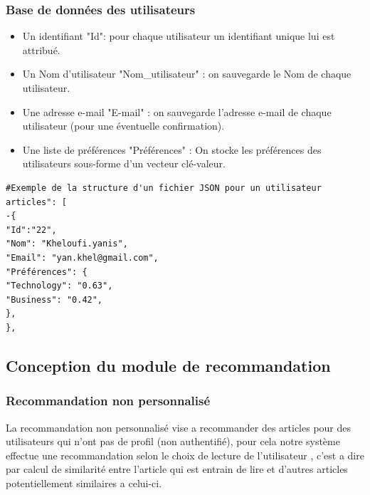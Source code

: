 \subsubsection{Base de données des utilisateurs}

\begin{itemize}
	
	\item Un identifiant "Id": pour chaque utilisateur un identifiant unique lui est attribué.\\
	
	\item Un Nom d'utilisateur "Nom\_utilisateur" : on sauvegarde le Nom de chaque utilisateur.\\
	
	\item Une adresse e-mail "E-mail" : on sauvegarde l'adresse e-mail de chaque utilisateur (pour une éventuelle confirmation).\\
	
	\item Une liste de préférences "Préférences" : On stocke les préférences des utilisateurs sous-forme d'un vecteur clé-valeur.\\
	
\end{itemize}

\begin{lstlisting}[style=code]
#Exemple de la structure d'un fichier JSON pour un utilisateur
articles": [
-{
"Id":"22",
"Nom": "Kheloufi.yanis",
"Email": "yan.khel@gmail.com",
"Préférences": {
"Technology": "0.63",
"Business": "0.42",
},
},
\end{lstlisting}

\subsection{Conception du module de recommandation}

\subsubsection{Recommandation non personnalisé}
La recommandation non personnalisé vise a recommander des articles pour des utilisateurs qui n'ont pas de profil (non authentifié), pour cela notre système effectue une recommandation selon le choix de lecture de l'utilisateur , c'est a dire par calcul de similarité entre l'article qui est entrain de lire et d'autres articles potentiellement similaires a celui-ci.\\

